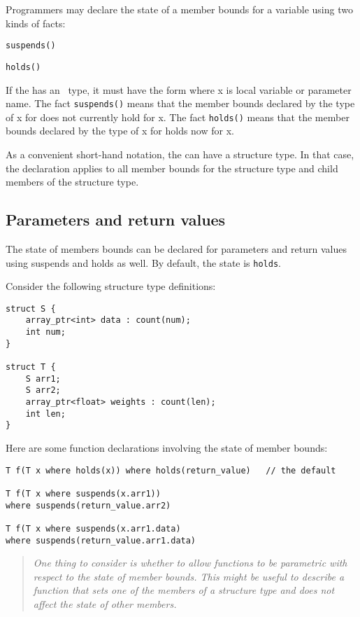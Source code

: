Programmers may declare the state of a member bounds for a variable
using two kinds of facts:


\var{\ldots{}}

\texttt{suspends(}\texttt{)}

\texttt{holds(}\texttt{)}

If the  has an \arrayptr\ type, it must
have the form  where x is local variable or parameter
name. The fact \texttt{suspends(}\texttt{)} means that the
member bounds declared by the type of x for  does not
currently hold for x. The fact \texttt{holds(}\texttt{)}
means that the member bounds declared by the type of x for 
holds now for x.

As a convenient short-hand notation, the  can have
a structure type. In that case, the declaration applies to all member
bounds for the structure type and child members of the structure type.

\subsection{Parameters and return values}\label{parameters-and-return-values}

The state of members bounds can be declared for parameters and return
values using suspends and holds as well. By default, the state is
\texttt{holds}.

Consider the following structure type definitions:

\begin{verbatim}
struct S {
    array_ptr<int> data : count(num);
    int num;
}

struct T {
    S arr1;
    S arr2;
    array_ptr<float> weights : count(len);
    int len;
}
\end{verbatim}

Here are some function declarations involving the state of member
bounds:
\begin{verbatim}
T f(T x where holds(x)) where holds(return_value)   // the default 

T f(T x where suspends(x.arr1))
where suspends(return_value.arr2)

T f(T x where suspends(x.arr1.data)
where suspends(return_value.arr1.data)
\end{verbatim}

\begin{quote}
\emph{One thing to consider is whether to allow functions to be
parametric with respect to the state of member bounds. This might be
useful to describe a function that sets one of the members of a
structure type and does not affect the state of other members.}
\end{quote}


